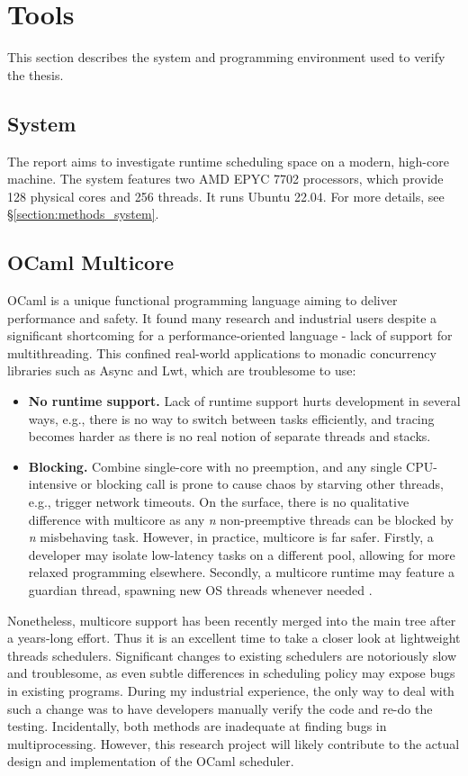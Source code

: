 \documentclass[12pt,a4paper,twoside]{report}
\begin{document}
\section{Tools}
This section describes the system and programming environment used to verify the thesis.  

\subsection{System}
The report aims to investigate runtime scheduling space on a modern, high-core machine. The system features two AMD EPYC 7702 processors, which provide 128 physical cores and 256 threads. It runs Ubuntu 22.04. For more details, see \S\ref{section:methods_system}. 

\subsection{OCaml Multicore}
\label{section:intr_ocaml-multicore}

OCaml is a unique functional programming language aiming to deliver performance and safety. It found many research and industrial users despite a significant shortcoming for a performance-oriented language - lack of support for multithreading. This confined real-world applications to monadic concurrency libraries such as Async and Lwt, which are troublesome to use: 
\begin{itemize}
    \item \textbf{No runtime support.} Lack of runtime support hurts development in several ways, e.g., there is no way to switch between tasks efficiently, and tracing becomes harder as there is no real notion of separate threads and stacks. 
    \item \textbf{Blocking.} Combine single-core with no preemption, and any single CPU-intensive or blocking call is prone to cause chaos by starving other threads, e.g., trigger network timeouts. On the surface, there is no qualitative difference with multicore as any \textit{n} non-preemptive threads can be blocked by \textit{n} misbehaving task. However, in practice, multicore is far safer. Firstly, a developer may isolate low-latency tasks on a different pool, allowing for more relaxed programming elsewhere. Secondly, a multicore runtime may feature a guardian thread, spawning new OS threads whenever needed \cite{golang}.
\end{itemize}

Nonetheless, multicore support has been recently merged into the main tree after a years-long effort. Thus it is an excellent time to take a closer look at lightweight threads schedulers. Significant changes to existing schedulers are notoriously slow and troublesome, as even subtle differences in scheduling policy may expose bugs in existing programs. During my industrial experience, the only way to deal with such a change was to have developers manually verify the code and re-do the testing. Incidentally, both methods are inadequate at finding bugs in multiprocessing. However, this research project will likely contribute to the actual design and implementation of the OCaml scheduler. 
\end{document}
